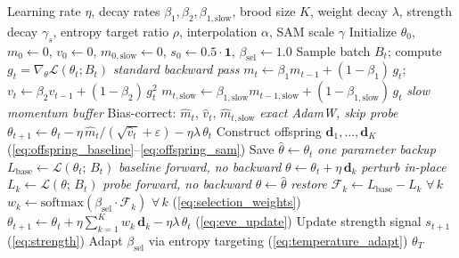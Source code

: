 \documentclass[12pt]{article}
\newcommand{\Loss}{\mathcal{L}}
\newcommand{\softmax}{\mathrm{softmax}}
\begin{document}
\begin{algorithm}[H]
\caption{EVE: Evolutionary Virtual Exploration.}
\label{alg:eve}
\begin{algorithmic}[1]
\Require Learning rate $\eta$, decay rates $\beta_1, \beta_2,
  \beta_{1,\mathrm{slow}}$,
  brood size $K$, weight decay $\lambda$, strength decay $\gamma_s$,
  entropy target ratio $\rho$, interpolation $\alpha$,
  SAM scale $\gamma$
\State Initialize $\theta_0$, $m_0 \leftarrow 0$, $v_0 \leftarrow 0$,
  $m_{0,\mathrm{slow}} \leftarrow 0$,
  $s_0 \leftarrow 0.5 \cdot \mathbf{1}$,
  $\beta_{\mathrm{sel}} \leftarrow 1.0$
  \State Sample batch $B_t$; compute $g_t = \nabla_\theta
    \Loss(\theta_t; B_t)$
    \hfill {\color{graytext}\textit{standard backward pass}}
  \State $m_t \leftarrow \beta_1 m_{t-1} + (1 - \beta_1)\,g_t$;
    \quad $v_t \leftarrow \beta_2 v_{t-1} + (1 - \beta_2)\,g_t^2$
  \State $m_{t,\mathrm{slow}} \leftarrow
    \beta_{1,\mathrm{slow}} m_{t-1,\mathrm{slow}}
    + (1 - \beta_{1,\mathrm{slow}})\,g_t$
    \hfill {\color{graytext}\textit{slow momentum buffer}}
  \State Bias-correct:
    $\hat{m}_t$, $\hat{v}_t$, $\hat{m}_{t,\mathrm{slow}}$
   \hfill {\color{graytext}\textit{exact AdamW, skip probe}}
    \State $\theta_{t+1} \leftarrow \theta_t
      - \eta\,\hat{m}_t / (\sqrt{\hat{v}_t} + \varepsilon)
      - \eta\lambda\,\theta_t$
  \Else
    \State Construct offspring $\mathbf{d}_1, \ldots, \mathbf{d}_K$
      \hfill (\cref{eq:offspring_baseline}--\cref{eq:offspring_sam})
    \State Save $\hat{\theta} \leftarrow \theta_t$
      \hfill {\color{graytext}\textit{one parameter backup}}
    \State $L_{\mathrm{base}} \leftarrow \Loss(\theta_t;\, B_t)$
      \hfill {\color{graytext}\textit{baseline forward, no backward}}
      \State $\theta \leftarrow \theta_t + \eta\,\mathbf{d}_k$
        \hfill {\color{graytext}\textit{perturb in-place}}
      \State $L_k \leftarrow \Loss(\theta;\, B_t)$
        \hfill {\color{graytext}\textit{probe forward, no backward}}
      \State $\theta \leftarrow \hat{\theta}$
        \hfill {\color{graytext}\textit{restore}}
    \EndFor
    \State $\mathcal{F}_k \leftarrow L_{\mathrm{base}} - L_k$
      \quad $\forall\,k$
    \State $w_k \leftarrow \softmax(\beta_{\mathrm{sel}} \cdot
      \mathcal{F}_k)$ \quad $\forall\,k$
      \hfill (\cref{eq:selection_weights})
    \State $\theta_{t+1} \leftarrow \theta_t
      + \eta \sum_{k=1}^K w_k\,\mathbf{d}_k
      - \eta\lambda\,\theta_t$
      \hfill (\cref{eq:eve_update})
  \EndIf
  \State Update strength signal $s_{t+1}$
    \hfill (\cref{eq:strength})
  \State Adapt $\beta_{\mathrm{sel}}$ via entropy targeting
    \hfill (\cref{eq:temperature_adapt})
\EndFor
\State \Return $\theta_T$
\end{algorithmic}
\end{algorithm}
\end{document}
